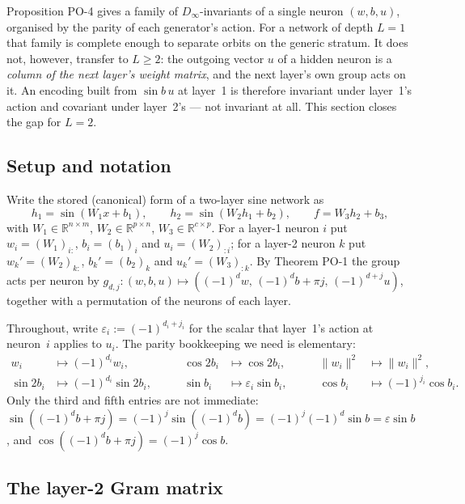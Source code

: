 \documentclass[11pt]{article}
\newcommand{\R}{\mathbb{R}}
\begin{document}
Proposition PO-4 gives a family of $D_\infty$-invariants of a single neuron $(w,b,u)$, organised by
the parity of each generator's action. For a network of depth $L=1$ that family is complete enough
to separate orbits on the generic stratum. It does not, however, transfer to $L\ge 2$: the outgoing
vector $u$ of a hidden neuron is a \emph{column of the next layer's weight matrix}, and the next
layer's own group acts on it. An encoding built from $\sin b\,u$ at layer~1 is therefore invariant
under layer~1's action and covariant under layer~2's --- not invariant at all. This section closes
the gap for $L=2$.

\subsection{Setup and notation}
Write the stored (canonical) form of a two-layer sine network as
\begin{equation}
h_1 = \sin(W_1x+b_1),\qquad h_2=\sin(W_2h_1+b_2),\qquad f = W_3h_2+b_3,
\end{equation}
with $W_1\in\R^{n\times m}$, $W_2\in\R^{p\times n}$, $W_3\in\R^{c\times p}$. For a layer-1 neuron
$i$ put $w_i = (W_1)_{i:}$, $b_i=(b_1)_i$ and $u_i = (W_2)_{:i}$; for a layer-2 neuron $k$ put
$w_k'=(W_2)_{k:}$, $b_k'=(b_2)_k$ and $u_k'=(W_3)_{:k}$. By Theorem PO-1 the group acts per neuron
by $g_{d,j}:(w,b,u)\mapsto((-1)^dw,\,(-1)^db+\pi j,\,(-1)^{d+j}u)$, together with a permutation of
the neurons of each layer.

Throughout, write $\varepsilon_i := (-1)^{d_i+j_i}$ for the scalar that layer~1's action at
neuron~$i$ applies to $u_i$. The parity bookkeeping we need is elementary:
\begin{equation}
\label{eq:parities}
\begin{aligned}
w_i &\mapsto (-1)^{d_i}w_i, &\qquad \cos 2b_i &\mapsto \cos 2b_i, &\qquad \|w_i\|^2&\mapsto\|w_i\|^2,\\
\sin 2b_i &\mapsto (-1)^{d_i}\sin 2b_i, &\qquad \sin b_i&\mapsto \varepsilon_i \sin b_i,
&\qquad \cos b_i &\mapsto (-1)^{j_i}\cos b_i .
\end{aligned}
\end{equation}
Only the third and fifth entries are not immediate: $\sin((-1)^db+\pi j) = (-1)^j\sin((-1)^db)
= (-1)^{j}(-1)^{d}\sin b = \varepsilon\sin b$, and $\cos((-1)^db+\pi j)=(-1)^j\cos b$.

\subsection{The layer-2 Gram matrix}
\end{document}
